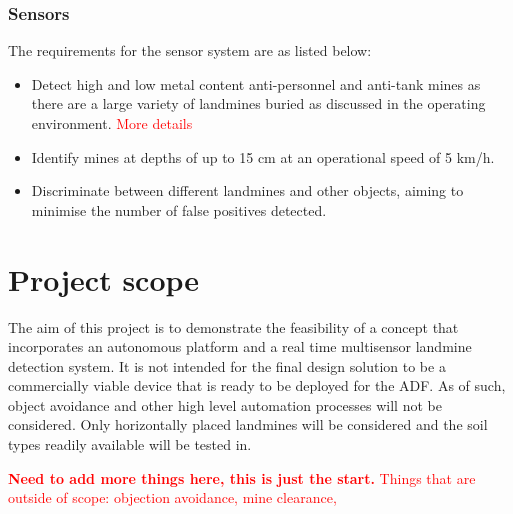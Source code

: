 \documentclass[main.tex]{subfiles}
\begin{document}
\subsubsection{Sensors}
The requirements for the sensor system are as listed below:
\begin{itemize}
\item Detect high and low metal content anti-personnel and anti-tank mines as there are a large variety of landmines buried as discussed in the operating environment. \textcolor{red}{More details}
\item Identify mines at depths of up to 15 cm at an operational speed of 5 km/h.
\item Discriminate between different landmines and other objects, aiming to minimise the number of false positives detected.
\end{itemize}

\section{Project scope}


The aim of this project is to demonstrate the feasibility of a concept that incorporates an autonomous platform and a real time multisensor landmine detection system. It is not intended for the final design solution to be a commercially viable device that is ready to be deployed for the ADF. As of such, object avoidance and other high level automation processes will not be considered. Only horizontally placed landmines will be considered and the soil types readily available will be tested in. 

\textcolor{red}{\textbf{Need to add more things here, this is just the start.} Things that are outside of scope: objection avoidance, mine clearance, }
\end{document}
